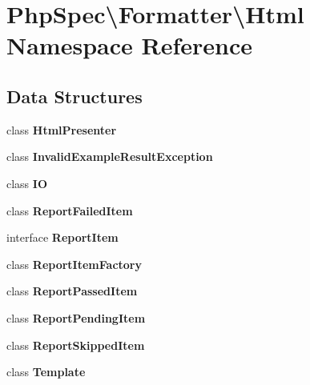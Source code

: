 \section{Php\+Spec\textbackslash{}Formatter\textbackslash{}Html Namespace Reference}
\label{namespace_php_spec_1_1_formatter_1_1_html}
\subsection*{Data Structures}
\begin{DoxyCompactItemize}
\item 
class {\bf Html\+Presenter}
\item 
class {\bf Invalid\+Example\+Result\+Exception}
\item 
class {\bf I\+O}
\item 
class {\bf Report\+Failed\+Item}
\item 
interface {\bf Report\+Item}
\item 
class {\bf Report\+Item\+Factory}
\item 
class {\bf Report\+Passed\+Item}
\item 
class {\bf Report\+Pending\+Item}
\item 
class {\bf Report\+Skipped\+Item}
\item 
class {\bf Template}
\end{DoxyCompactItemize}
